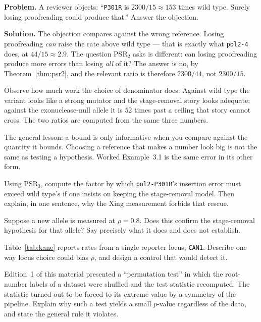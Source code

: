 \begin{worked}
\textbf{Problem.} A reviewer objects: ``\texttt{P301R} is $2300/15 \approx 153$
times wild type. Surely losing proofreading could produce that.'' Answer the
objection.

\textbf{Solution.} The objection compares against the wrong reference. Losing
proofreading \emph{can} raise the rate above wild type --- that is exactly what
\texttt{pol2-4} does, at $44/15 \approx 2.9$. The question PSR$_2$ asks is
different: can losing proofreading produce more errors than losing \emph{all} of
it? The answer is no, by Theorem~\ref{thm:psr2}, and the relevant ratio is
therefore $2300/44$, not $2300/15$.

Observe how much work the choice of denominator does. Against wild type the
variant looks like a strong mutator and the stage-removal story looks adequate;
against the exonuclease-null allele it is $52$ times past a ceiling that story
cannot cross. The two ratios are computed from the same three numbers.

The general lesson: a bound is only informative when you compare against the
quantity it bounds. Choosing a reference that makes a number look big is not the
same as testing a hypothesis. Worked Example~3.1 is the same error in its other
form.
\end{worked}

\begin{exercise}
Using PSR$_3$, compute the factor by which \texttt{pol2-P301R}'s insertion error
must exceed wild type's if one insists on keeping the stage-removal model.
Then explain, in one sentence, why the Xing measurement forbids that rescue.
\end{exercise}

\begin{exercise}
Suppose a new allele is measured at $\rho = 0.8$. Does this confirm the
stage-removal hypothesis for that allele? Say precisely what it does and does not
establish.
\end{exercise}

\begin{exercise}
Table~\ref{tab:kane} reports rates from a single reporter locus, \texttt{CAN1}.
Describe one way locus choice could bias $\rho$, and design a control that would
detect it.
\end{exercise}

\begin{exercise}[(harder)]
Edition~1 of this material presented a ``permutation test'' in which the
root-number labels of a dataset were shuffled and the test statistic recomputed.
The statistic turned out to be forced to its extreme value by a symmetry of the
pipeline. Explain why such a test yields a small $p$-value regardless of the data,
and state the general rule it violates.
\end{exercise}

